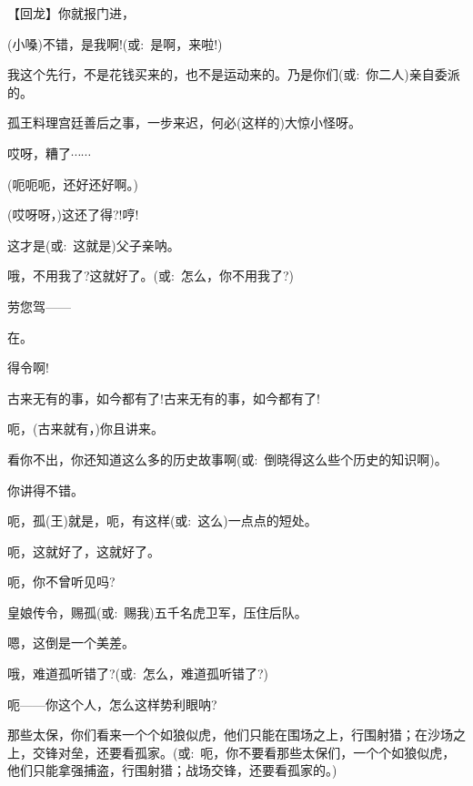 {



【{\akai 回龙}】你就报门进，


({\hwfs 小嗓})不错，是我啊!({\akai 或}:~是啊，来啦!)

我这个先行，不是花钱买来的，也不是运动来的。乃是你们({\akai 或}:~你二人)亲自委派的。

孤王料理宫廷善后之事，一步来迟，何必(这样的)大惊小怪呀。

哎呀，糟了$\cdots{}\cdots{}$

(呃呃呃，还好还好啊。)

(哎呀呀，)这还了得?!哼!

这才是({\akai 或}:~这就是)父子亲呐。

哦，不用我了?这就好了。({\akai 或}:~怎么，你不用我了?)

劳您驾------

在。\hspace{30pt}~

得令啊!\hspace{20pt}~

古来无有的事，如今都有了!古来无有的事，如今都有了!

呃，(古来就有，)你且讲来。

看你不出，你还知道这么多的历史故事啊({\akai 或}:~倒晓得这么些个历史的知识啊)。

你讲得不错。

呃，孤(王)就是，呃，有这样({\akai 或}:~这么)一点点的短处。

呃，这就好了，这就好了。

呃，你不曾听见吗?

皇娘传令，赐孤({\akai 或}:~赐我)五千名虎卫军，压住后队。

嗯，这倒是一个美差。

哦，难道孤听错了?({\akai 或}:~怎么，难道孤听错了?)

呃------你这个人，怎么这样势利眼呐?

那些太保，你们看来一个个如狼似虎，他们只能在围场之上，行围射猎；在沙场之上，交锋对垒，还要看孤家。({\akai 或}:~呃，你不要看那些太保们，一个个如狼似虎，他们只能拿强捕盗，行围射猎；战场交锋，还要看孤家的。)

}

